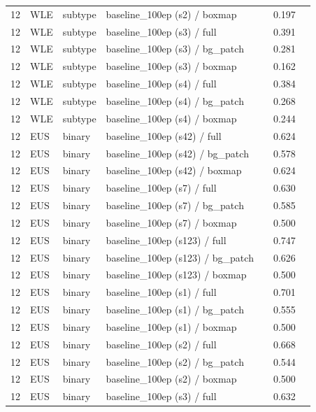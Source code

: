 \begin{longtable}{cL{1.1cm}L{1.5cm}L{5.6cm}ccc}
12 & WLE & subtype & baseline\_100ep (s2) / boxmap & \nl{} & 0.197 & \nl{} \\
12 & WLE & subtype & baseline\_100ep (s3) / full & \nl{} & 0.391 & \nl{} \\
12 & WLE & subtype & baseline\_100ep (s3) / bg\_patch & \nl{} & 0.281 & \nl{} \\
12 & WLE & subtype & baseline\_100ep (s3) / boxmap & \nl{} & 0.162 & \nl{} \\
12 & WLE & subtype & baseline\_100ep (s4) / full & \nl{} & 0.384 & \nl{} \\
12 & WLE & subtype & baseline\_100ep (s4) / bg\_patch & \nl{} & 0.268 & \nl{} \\
12 & WLE & subtype & baseline\_100ep (s4) / boxmap & \nl{} & 0.244 & \nl{} \\
12 & EUS & binary & baseline\_100ep (s42) / full & \nl{} & 0.624 & \nl{} \\
12 & EUS & binary & baseline\_100ep (s42) / bg\_patch & \nl{} & 0.578 & \nl{} \\
12 & EUS & binary & baseline\_100ep (s42) / boxmap & \nl{} & 0.624 & \nl{} \\
12 & EUS & binary & baseline\_100ep (s7) / full & \nl{} & 0.630 & \nl{} \\
12 & EUS & binary & baseline\_100ep (s7) / bg\_patch & \nl{} & 0.585 & \nl{} \\
12 & EUS & binary & baseline\_100ep (s7) / boxmap & \nl{} & 0.500 & \nl{} \\
12 & EUS & binary & baseline\_100ep (s123) / full & \nl{} & 0.747 & \nl{} \\
12 & EUS & binary & baseline\_100ep (s123) / bg\_patch & \nl{} & 0.626 & \nl{} \\
12 & EUS & binary & baseline\_100ep (s123) / boxmap & \nl{} & 0.500 & \nl{} \\
12 & EUS & binary & baseline\_100ep (s1) / full & \nl{} & 0.701 & \nl{} \\
12 & EUS & binary & baseline\_100ep (s1) / bg\_patch & \nl{} & 0.555 & \nl{} \\
12 & EUS & binary & baseline\_100ep (s1) / boxmap & \nl{} & 0.500 & \nl{} \\
12 & EUS & binary & baseline\_100ep (s2) / full & \nl{} & 0.668 & \nl{} \\
12 & EUS & binary & baseline\_100ep (s2) / bg\_patch & \nl{} & 0.544 & \nl{} \\
12 & EUS & binary & baseline\_100ep (s2) / boxmap & \nl{} & 0.500 & \nl{} \\
12 & EUS & binary & baseline\_100ep (s3) / full & \nl{} & 0.632 & \nl{} \\

\end{longtable}
